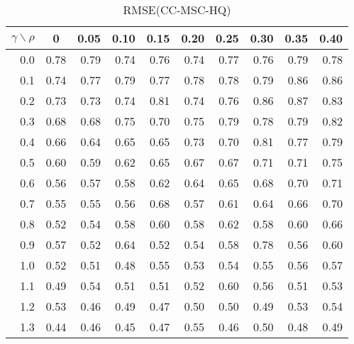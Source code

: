 \documentclass[12pt]{article}
\begin{document}
%
\begin{table}[!tbp]
\caption{RMSE(CC-MSC-HQ)}
 \begin{center}
 \begin{tabular}{r|rrrrrrrrr}\hline\hline
\multicolumn{1}{c|}{$\gamma\backslash\rho$}&\multicolumn{1}{c}{0}&\multicolumn{1}{c}{0.05}&\multicolumn{1}{c}{0.10}&\multicolumn{1}{c}{0.15}&\multicolumn{1}{c}{0.20}&\multicolumn{1}{c}{0.25}&\multicolumn{1}{c}{0.30}&\multicolumn{1}{c}{0.35}&\multicolumn{1}{c}{0.40}\tabularnewline
\hline

0.0&0.78&0.79&0.74&0.76&0.74&0.77&0.76&0.79&0.78\tabularnewline
0.1&0.74&0.77&0.79&0.77&0.78&0.78&0.79&0.86&0.86\tabularnewline
0.2&0.73&0.73&0.74&0.81&0.74&0.76&0.86&0.87&0.83\tabularnewline
0.3&0.68&0.68&0.75&0.70&0.75&0.79&0.78&0.79&0.82\tabularnewline
0.4&0.66&0.64&0.65&0.65&0.73&0.70&0.81&0.77&0.79\tabularnewline
0.5&0.60&0.59&0.62&0.65&0.67&0.67&0.71&0.71&0.75\tabularnewline
0.6&0.56&0.57&0.58&0.62&0.64&0.65&0.68&0.70&0.71\tabularnewline
0.7&0.55&0.55&0.56&0.68&0.57&0.61&0.64&0.66&0.70\tabularnewline
0.8&0.52&0.54&0.58&0.60&0.58&0.62&0.58&0.60&0.66\tabularnewline
0.9&0.57&0.52&0.64&0.52&0.54&0.58&0.78&0.56&0.60\tabularnewline
1.0&0.52&0.51&0.48&0.55&0.53&0.54&0.55&0.56&0.57\tabularnewline
1.1&0.49&0.54&0.51&0.51&0.52&0.60&0.56&0.51&0.53\tabularnewline
1.2&0.53&0.46&0.49&0.47&0.50&0.50&0.49&0.53&0.54\tabularnewline
1.3&0.44&0.46&0.45&0.47&0.55&0.46&0.50&0.48&0.49\tabularnewline
\hline
\end{tabular}

\end{center}

\end{table}
\end{document}

